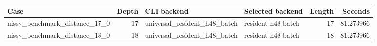 {\small
\begin{tabular}{lrllrr}
\hline
Case & Depth & CLI backend & Selected backend & Length & Seconds \\
\hline
nissy\_benchmark\_distance\_17\_0 & 17 & universal\_resident\_h48\_batch & resident-h48-batch & 17 & 81.273966 \\
nissy\_benchmark\_distance\_18\_0 & 18 & universal\_resident\_h48\_batch & resident-h48-batch & 18 & 81.273966 \\
\hline
\end{tabular}
}
